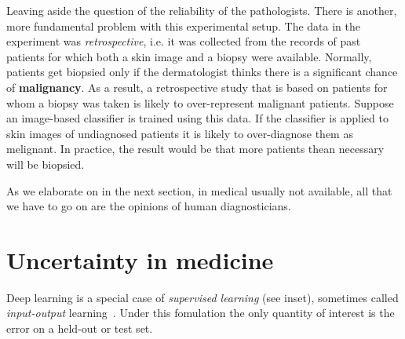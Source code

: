 \documentclass[11pt]{pnas-new}
\begin{document}
Leaving aside the question of the reliability of the
pathologists. There is another, more fundamental problem with this
experimental setup. The data in the experiment was {\em
  retrospective}, i.e. it was collected from the records of past
patients for which both a skin image and a biopsy were
available. Normally, patients get biopsied only if the dermatologist
thinks there is a significant chance of {\bf malignancy}. As a result,
a retrospective study that is based on patients for whom a biopsy was
taken is likely to over-represent malignant patients. Suppose an
image-based classifier is trained using this data. If the classifier
is applied to skin images of undiagnosed patients it is likely to
over-diagnose them as melignant. In practice, the result would be that
more patients thean necessary will be biopsied.


As we elaborate on in the next section, in medical 
usually not available, all that we have to go on are the
opinions of human diagnosticians.

\section{Uncertainty in medicine}


  Deep learning is a special case of {\em supervised learning} (see
  inset), sometimes called {\em input-output}
  learning~\cite{ng2016artificial,topol2019deep}.
  Under this fomulation the only quantity of interest is the error on
  a held-out or test set.
\end{document}

